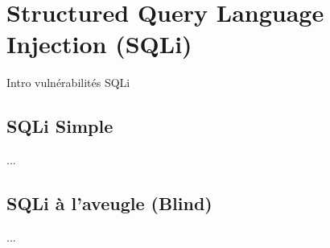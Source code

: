 

\section{Structured Query Language Injection (SQLi)}\label{vulnerabilites:web:sqli}

Intro vulnérabilités SQLi

\subsection{SQLi Simple}\label{vulnerabilites:web:sqli:simple}

...

\subsection{SQLi à l'aveugle (Blind)}\label{vulnerabilites:web:sqli:blind}

...

\endinput
